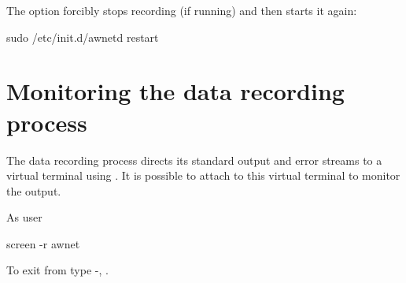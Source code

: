 \label{awnetd-restart}
The  option forcibly stops recording (if running) and
then starts it again:
\begin{Cmd}
sudo /etc/init.d/awnetd restart
\end{Cmd}

\section{Monitoring the data recording process}

The data recording process directs its standard output and error
streams to a virtual terminal using . It is possible to
attach to this virtual terminal to monitor the output.

As user \piUser
\begin{Cmd}
screen -r awnet
\end{Cmd}

To exit from  type -,
. 





